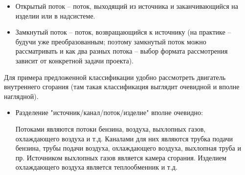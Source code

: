 \documentclass[a4paper,11pt]{article}
\begin{document}
\begin{itemize}
\item Открытый поток -- поток, выходящий из источника и заканчивающийся на
  изделии или в надсистеме.
\item Замкнутый поток -- поток, возвращающийся к источнику (на практике --
  будучи уже преобразованным; поэтому замкнутый поток можно рассматривать и
  как два разных потока -- выбор формата рассмотрения зависит от конкретной
  задачи проекта).
\end{itemize}
Для примера предложенной классификации удобно рассмотреть двигатель
внутреннего сгорания (там такая классификация выглядит очевидной и вполне
наглядной).
\begin{itemize}
\item Разделение "источник/канал/поток/изделие" вполне очевидно:

  Потоками являются потоки бензина, воздуха, выхлопных газов, охлаждающего
  воздуха и т.д. Каналами для них являются трубка подачи бензина, трубы подачи
  воздуха, охлаждающего воздуха, выхлопная труба и пр. Источником выхлопных
  газов является камера сгорания. Изделием охлаждающего воздуха является
  теплообменник и т.д.


\end{itemize}
\end{document}
